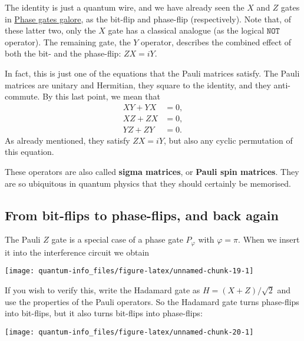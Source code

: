 \documentclass[fleqn]{article}
\renewcommand{\footnote}[1]{\en{#1}}
\begin{document}
The identity is just a quantum wire, and we have already seen the \(X\) and \(Z\) gates in \protect\hyperlink{phase-gates-galore}{Phase gates galore}, as the bit-flip and phase-flip (respectively).
Note that, of these latter two, only the \(X\) gate has a classical analogue (as the logical \(\texttt{NOT}\) operator).
The remaining gate, the \(Y\) operator, describes the combined effect of both the bit- and the phase-flip: \(ZX=iY\).

In fact, this is just one of the equations that the Pauli matrices satisfy.
The Pauli matrices are unitary and Hermitian, they square to the identity, and they anti-commute.
By this last point, we mean that
\[
  \begin{aligned}
    XY+YX&=0,
  \\XZ+ZX&=0,
  \\YZ+ZY&=0.
  \end{aligned}
\]
As already mentioned, they satisfy \(ZX=iY\), but also any cyclic permutation of this equation.

These operators are also called \textbf{sigma matrices}, or \textbf{Pauli spin matrices}.
They are so ubiquitous in quantum physics that they should certainly be memorised.

\hypertarget{from-bit-flips-to-phase-flips-and-back-again}{%
\subsection{From bit-flips to phase-flips, and back again}\label{from-bit-flips-to-phase-flips-and-back-again}}

The Pauli \(Z\) gate is a special case of a phase gate \(P_\varphi\) with \(\varphi=\pi\).
When we insert it into the interference circuit we obtain

\begin{center}\texttt{[image: quantum-info\_files/figure-latex/unnamed-chunk-19-1]} \end{center}

If you wish to verify this, write the Hadamard gate as \(H = (X+Z)/\sqrt{2}\) and use the properties of the Pauli operators.\footnote{\(\begin{aligned}HXH &= Z\\HZH &= X\\HYH &= -Y\end{aligned}\)}
So the Hadamard gate turns phase-flips into bit-flips, but it also turns bit-flips into phase-flips:

\begin{center}\texttt{[image: quantum-info\_files/figure-latex/unnamed-chunk-20-1]} \end{center}
\end{document}
